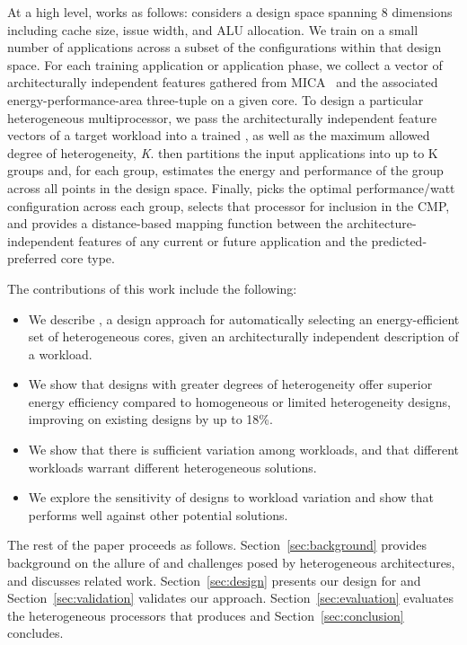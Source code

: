 At a high level, \blackBox{} works as follows: \blackBox{} considers a
design space spanning 8 dimensions including cache
size, issue width, and ALU allocation. We train on a small number
of applications across a subset of the configurations within that
design space. For each training application or application phase, we
collect a vector of architecturally independent features
gathered from MICA~\cite{Hoste07-IEEEMICRO-MICA} and the associated
energy-performance-area three-tuple on a given core. To design a
particular heterogeneous multiprocessor, we pass the architecturally
independent feature vectors of a target workload into a trained
\blackBox{}, as well as the maximum allowed degree of heterogeneity,
\textit{K}. \blackBox{} then partitions the input applications into up
to K groups and, for each group, estimates the energy and performance
of the group across all points in the design space. Finally,
\blackBox{} picks the optimal performance/watt configuration across
each group, selects that processor for inclusion in the CMP, and
provides a distance-based mapping function between the
architecture-independent features of any current or future application
and the predicted-preferred core type.

The contributions of this work include the following:
\begin{itemize}
\item We describe \blackBox{}, a design approach for automatically
  selecting an energy-efficient set of heterogeneous cores, given an
  architecturally independent description of a workload.
\item We show that \blackBox{} designs with greater degrees of
  heterogeneity offer superior energy efficiency compared to
  homogeneous or limited heterogeneity designs, improving on existing
  designs by up to 18\%.
\item We show that there is sufficient variation among workloads, and that
  different workloads warrant different heterogeneous solutions.
\item We explore the sensitivity of \blackBox{} designs to workload
  variation and show that \Ravan{} performs well against other potential
  solutions.
\end{itemize}

The rest of the paper proceeds as
follows. Section~\ref{sec:background} provides background on the
allure of and challenges posed by heterogeneous architectures, and
discusses related work. Section~\ref{sec:design} presents our design
for \blackBox{} and Section~\ref{sec:validation} validates our
approach. Section~\ref{sec:evaluation} evaluates the heterogeneous
processors that \blackBox{} produces and Section~\ref{sec:conclusion}
concludes.

